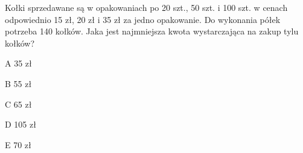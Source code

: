 \begin{tresc}
Kołki sprzedawane są w opakowaniach po 20 szt., 50 szt. i 100 szt. w cenach odpowiednio 15 zł, 20 zł i 35 zł za jedno opakowanie. Do wykonania półek potrzeba 140 kołków. Jaka jest najmniejsza kwota wystarczająca na zakup tylu kołków?
\end{tresc}
\begin{wariant}{A} 35 zł \end{wariant}
\begin{wariant}{B} 55 zł \end{wariant}
\begin{wariant}{C} 65 zł \end{wariant}
\begin{wariant}{D} 105 zł \end{wariant}
\begin{wariant}{E} 70 zł \end{wariant}
